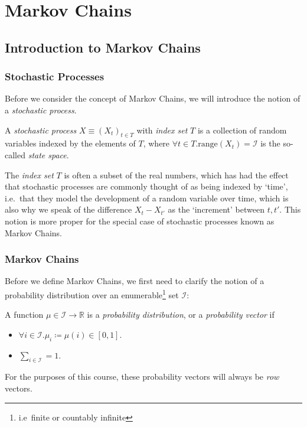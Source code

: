 \chapter{Markov Chains}

\section{Introduction to Markov Chains}
	
	\subsection{Stochastic Processes}

	Before we consider the concept of Markov Chains, we will introduce the notion of a \emph{stochastic 
	process}. 
	\begin{definition}
		A \emph{stochastic process} $X \equiv (X_t)_{t \in T}$ with \emph{index set} $T$ is a collection 
		of random variables indexed by the elements of $T$, where $\forall t \in T. \mathrm{range}(X_t) 
		= \mathcal{I}$ is the so-called \emph{state space}. 
	\end{definition}
	\begin{comment}
		The random variables of a stochastic process do not necessarily conform entirely with the 
		definition given in Chapter 1. The state space $\mathcal{I}$ can have $\mathcal{I} \not\subseteq
		\mathbb{R}$, which is what violates the earlier definition; for example, they can take values from
		higher powers of the real numbers.
	\end{comment}
	The \emph{index set} $T$ is often a subset of the real numbers, which has had the effect that stochastic 
	processes are commonly thought of as being indexed by `time', i.e.\ that they model the development of
	a random variable over time, which is also why we speak of the difference $X_t - X_{t'}$ as the 
	`increment' between $t, t'$. This notion is more proper for the special case of stochastic processes known
	as Markov Chains.

	\subsection{Markov Chains}
	
	Before we define Markov Chains, we first need to clarify the notion of a probability distribution over an
	enumerable\footnote{i.e\ finite or countably infinite} set $\mathcal{I}$:
	\begin{definition}
		A function $\mu \in \mathcal{I} \rightarrow \mathbb{R}$ is a \emph{probability distribution},
		or a \emph{probability vector} if 
		\begin{itemize}
			\item $\forall i \in \mathcal{I}. \mu_i \coloneqq \mu(i) \in [0,1]$.
			\item $\sum_{i \in \mathcal{I}} = 1$.
		\end{itemize}
		For the purposes of this course, these probability vectors will always be \emph{row} vectors.
	\end{definition}

